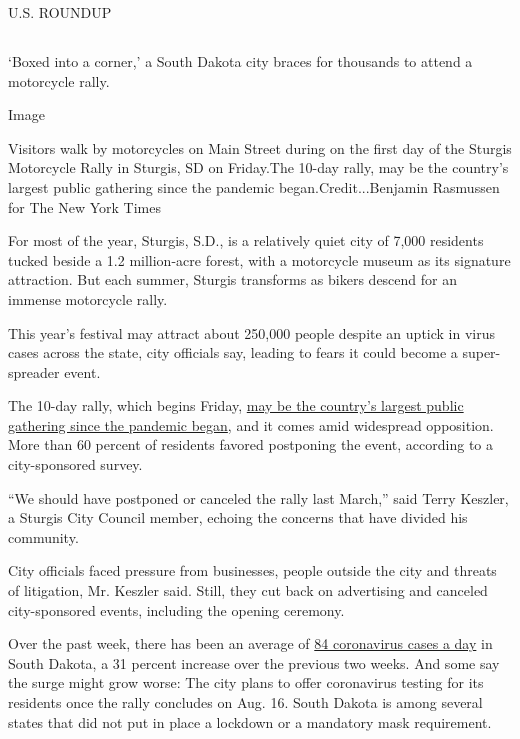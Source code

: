 U.S. ROUNDUP

\hypertarget{section-7}{%
\subsection{}\label{section-7}}

`Boxed into a corner,' a South Dakota city braces for thousands to
attend a motorcycle rally.

Image

Visitors walk by motorcycles on Main Street during on the first day of
the Sturgis Motorcycle Rally in Sturgis, SD on Friday.The 10-day rally,
may be the country's largest public gathering since the pandemic
began.Credit...Benjamin Rasmussen for The New York Times

For most of the year, Sturgis, S.D., is a relatively quiet city of 7,000
residents tucked beside a 1.2 million-acre forest, with a motorcycle
museum as its signature attraction. But each summer, Sturgis transforms
as bikers descend for an immense motorcycle rally.

This year's festival may attract about 250,000 people despite an uptick
in virus cases across the state, city officials say, leading to fears it
could become a super-spreader event.

The 10-day rally, which begins Friday,
\href{https://www.nytimes3xbfgragh.onion/2020/08/06/us/sturgis-motorcyle-rally-coronavirus.html}{may
be the country's largest public gathering since the pandemic began}, and
it comes amid widespread opposition. More than 60 percent of residents
favored postponing the event, according to a city-sponsored survey.

``We should have postponed or canceled the rally last March,'' said
Terry Keszler, a Sturgis City Council member, echoing the concerns that
have divided his community.

City officials faced pressure from businesses, people outside the city
and threats of litigation, Mr. Keszler said. Still, they cut back on
advertising and canceled city-sponsored events, including the opening
ceremony.

Over the past week, there has been an average of
\href{https://www.nytimes3xbfgragh.onion/interactive/2020/us/south-dakota-coronavirus-cases.html}{84
coronavirus cases a day} in South Dakota, a 31 percent increase over the
previous two weeks. And some say the surge might grow worse: The city
plans to offer coronavirus testing for its residents once the rally
concludes on Aug. 16. South Dakota is among several states that did not
put in place a lockdown or a mandatory mask requirement.

